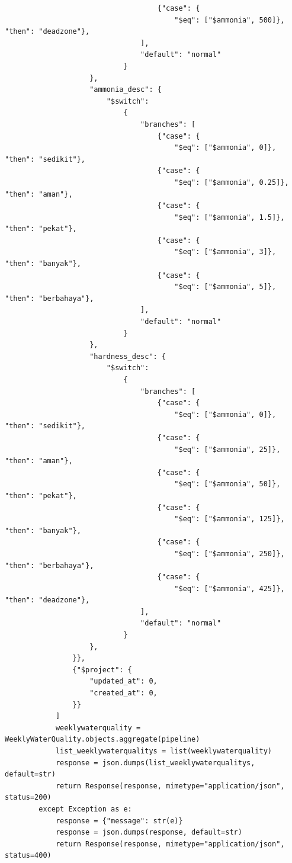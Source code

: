 \begin{enumerate}[1.]
\begin{lstlisting}
                                    {"case": {
                                        "$eq": ["$ammonia", 500]}, "then": "deadzone"},
                                ],
                                "default": "normal"
                            }
                    },
                    "ammonia_desc": {
                        "$switch":
                            {
                                "branches": [
                                    {"case": {
                                        "$eq": ["$ammonia", 0]}, "then": "sedikit"},
                                    {"case": {
                                        "$eq": ["$ammonia", 0.25]}, "then": "aman"},
                                    {"case": {
                                        "$eq": ["$ammonia", 1.5]}, "then": "pekat"},
                                    {"case": {
                                        "$eq": ["$ammonia", 3]}, "then": "banyak"},
                                    {"case": {
                                        "$eq": ["$ammonia", 5]}, "then": "berbahaya"},
                                ],
                                "default": "normal"
                            }
                    },
                    "hardness_desc": {
                        "$switch":
                            {
                                "branches": [
                                    {"case": {
                                        "$eq": ["$ammonia", 0]}, "then": "sedikit"},
                                    {"case": {
                                        "$eq": ["$ammonia", 25]}, "then": "aman"},
                                    {"case": {
                                        "$eq": ["$ammonia", 50]}, "then": "pekat"},
                                    {"case": {
                                        "$eq": ["$ammonia", 125]}, "then": "banyak"},
                                    {"case": {
                                        "$eq": ["$ammonia", 250]}, "then": "berbahaya"},
                                    {"case": {
                                        "$eq": ["$ammonia", 425]}, "then": "deadzone"},
                                ],
                                "default": "normal"
                            }
                    },
                }},
                {"$project": {
                    "updated_at": 0,
                    "created_at": 0,
                }}
            ]
            weeklywaterquality = WeeklyWaterQuality.objects.aggregate(pipeline)
            list_weeklywaterqualitys = list(weeklywaterquality)
            response = json.dumps(list_weeklywaterqualitys, default=str)
            return Response(response, mimetype="application/json", status=200)
        except Exception as e:
            response = {"message": str(e)}
            response = json.dumps(response, default=str)
            return Response(response, mimetype="application/json", status=400)
\end{lstlisting}



\end{enumerate}
